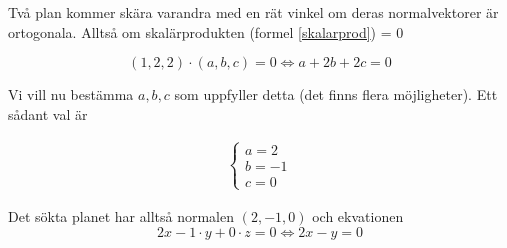 \documentclass[../../main.tex]{subfiles}
\begin{document}
\begin{solution}{19}

Två plan kommer skära varandra med en rät vinkel om deras normalvektorer är ortogonala. Alltså om skalärprodukten (formel \ref{skalarprod}) = 0

$$(1, 2, 2) \cdot (a, b, c) = 0 \iff a + 2b +2c = 0$$

Vi vill nu bestämma $a, b, c$ som uppfyller detta (det finns flera möjligheter). Ett sådant val är 

\begin{align*}
    \begin{cases} 
     a = 2\\
     b = -1\\
     c = 0
    \end{cases}
\end{align*}

Det sökta planet har alltså normalen $(2, -1, 0)$ och ekvationen $$2x -1\cdot y + 0\cdot z = 0 \iff 2x - y = 0$$


\end{solution}
\end{document}
